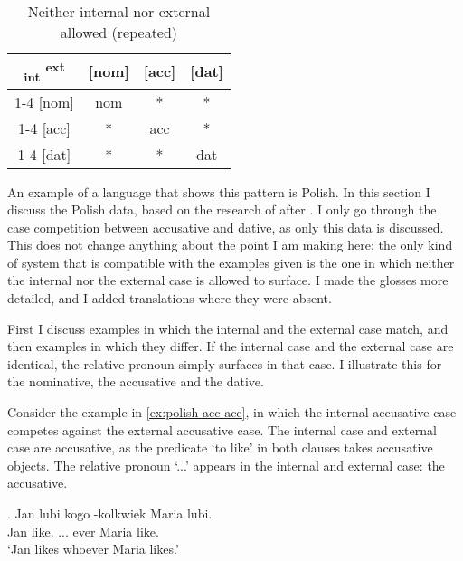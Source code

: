 \begin{table}[H]
  \center
  \caption{Neither internal nor external allowed (repeated)}
  \begin{tabular}{c|c|c|c}
    \toprule
    \textsubscript{\ac{int}} \textsuperscript{\ac{ext}}
           & [\ac{nom}]
           & [\ac{acc}]
           & [\ac{dat}]
           \\ \cmidrule{1-4}
       [\ac{nom}]
           & \ac{nom}
           & *
           & *
           \\ \cmidrule{1-4}
       [\ac{acc}]
           & *
           & \ac{acc}
           & *
           \\ \cmidrule{1-4}
       [\ac{dat}]
           & *
           & *
           & \ac{dat}
           \\
     \bottomrule
  \end{tabular}
    \label{tbl:case-competition-none-repeated}
\end{table}

An example of a language that shows this pattern is Polish. In this section I discuss the Polish data, based on the research of \citet{citko2013} after \citet{himmelreich2017}. I only go through the case competition between accusative and dative, as only this data is discussed. This does not change anything about the point I am making here: the only kind of system that is compatible with the examples given is the one in which neither the internal nor the external case is allowed to surface. I made the glosses more detailed, and I added translations where they were absent.

First I discuss examples in which the internal and the external case match, and then examples in which they differ. If the internal case and the external case are identical, the relative pronoun simply surfaces in that case. I illustrate this for the nominative, the accusative and the dative.

Consider the example in \ref{ex:polish-acc-acc}, in which the internal accusative case competes against the external accusative case.
The internal case and external case are accusative, as the predicate  `to like' in both clauses takes accusative objects.
The relative pronoun  `...' appears in the internal and external case: the accusative.

\exg. Jan lubi kogo -kolkwiek Maria lubi.\\
 Jan like.\scsub{[acc]} ... ever Maria like.\scsub{[acc]}\\
 `Jan likes whoever Maria likes.' \label{ex:polish-acc-acc}

